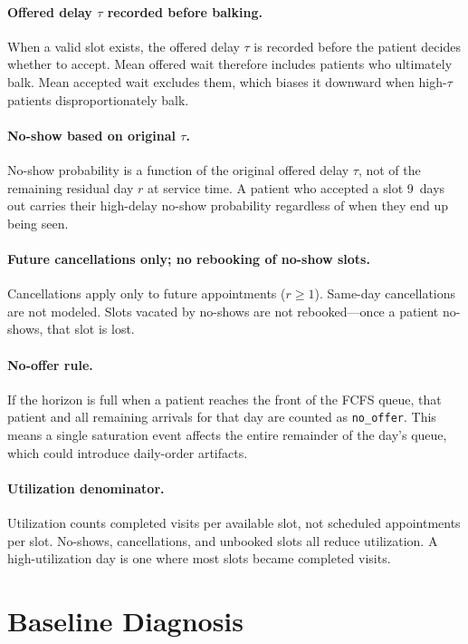 \documentclass[11pt]{article}
\begin{document}
\paragraph{Offered delay $\tau$ recorded before balking.}
When a valid slot exists, the offered delay $\tau$ is recorded before the
patient decides whether to accept. Mean offered wait therefore includes
patients who ultimately balk. Mean accepted wait excludes them, which biases
it downward when high-$\tau$ patients disproportionately balk.

\paragraph{No-show based on original $\tau$.}
No-show probability is a function of the original offered delay $\tau$, not of
the remaining residual day $r$ at service time. A patient who accepted a slot
9~days out carries their high-delay no-show probability regardless of when they
end up being seen.

\paragraph{Future cancellations only; no rebooking of no-show slots.}
Cancellations apply only to future appointments ($r \geq 1$). Same-day
cancellations are not modeled. Slots vacated by no-shows are not
rebooked---once a patient no-shows, that slot is lost.

\paragraph{No-offer rule.}
If the horizon is full when a patient reaches the front of the FCFS queue,
that patient and all remaining arrivals for that day are counted as
\texttt{no\_offer}. This means a single saturation event affects the entire
remainder of the day's queue, which could introduce daily-order artifacts.

\paragraph{Utilization denominator.}
Utilization counts completed visits per available slot, not scheduled
appointments per slot. No-shows, cancellations, and unbooked slots all reduce
utilization. A high-utilization day is one where most slots became completed
visits.

\section{Baseline Diagnosis}
\label{sec:baseline}
\end{document}
